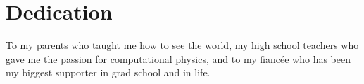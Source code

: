 \newpage
{}

\section*{\large Dedication}

\begin{center}
To my parents who taught me how to see the world, my high school teachers who gave me the passion for computational physics, and to my fiancée who has been my biggest supporter in grad school and in life. 
\end{center}
